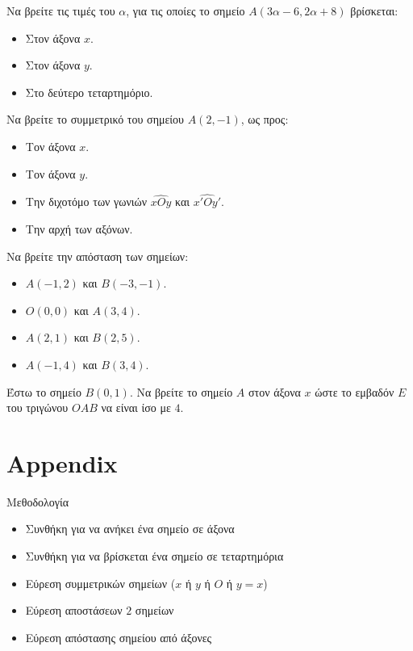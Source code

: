 \documentclass{../../presentation}
\begin{document}
\exercises

\begin{askisi}
  Να βρείτε τις τιμές του $α$, για τις οποίες το σημείο $Α(3α-6,2α+8)$ βρίσκεται:
  \begin{itemize}
    \item Στον άξονα $x$.
    \item Στον άξονα $y$.
    \item Στο δεύτερο τεταρτημόριο.
  \end{itemize}
\end{askisi}

\begin{askisi}
  Να βρείτε το συμμετρικό του σημείου $A(2,-1)$, ως προς:
  \begin{itemize}
    \item Τον άξονα $x$.
    \item Τον άξονα $y$.
    \item Την διχοτόμο των γωνιών $\widehat{xOy}$ και $\widehat{x'Oy'}$.
    \item Την αρχή των αξόνων.
  \end{itemize}
\end{askisi}

\begin{askisi}
  Να βρείτε την απόσταση των σημείων:
  \begin{itemize}
    \item $A(-1,2)$ και $B(-3,-1)$.
    \item $Ο(0,0)$ και $A(3,4)$.
    \item $A(2,1)$ και $B(2,5)$.
    \item $A(-1,4)$ και $B(3,4)$.
  \end{itemize}
\end{askisi}

\begin{askisi}
  Έστω το σημείο $Β(0,1)$. Να βρείτε το σημείο $A$ στον άξονα $x$ ώστε το εμβαδόν $Ε$ του τριγώνου $OAB$ να είναι ίσο με $4$.
\end{askisi}

\section{Appendix}

\begin{frame}{Μεθοδολογία}
  \begin{itemize}
    \item Συνθήκη για να ανήκει ένα σημείο σε άξονα
    \item Συνθήκη για να βρίσκεται ένα σημείο σε τεταρτημόρια
    \item Εύρεση συμμετρικών σημείων ($x$ ή $y$ ή $O$ ή $y=x$)
    \item Εύρεση αποστάσεων $2$ σημείων
    \item Εύρεση απόστασης σημείου από άξονες
  \end{itemize}
\end{frame}
\end{document}
